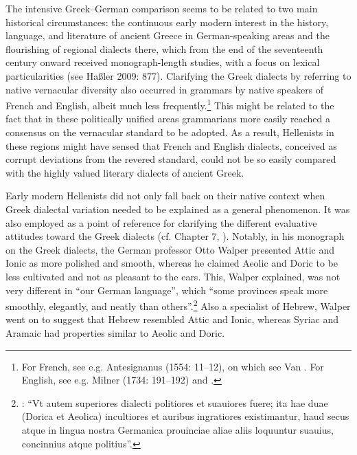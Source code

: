 \documentclass[output=paper]{langsci/langscibook}
\begin{document}
The intensive Greek–German comparison seems to be related to two main historical circumstances: the continuous early modern interest in the history, language, and literature of ancient Greece in German-speaking areas and the flourishing of regional dialects there, which from the end of the seventeenth century onward received monograph-length studies, with a focus on lexical particularities (see Haßler 2009: 877). Clarifying the Greek dialects by referring to native vernacular diversity also occurred in grammars by native speakers of French and English, albeit much less frequently.\footnote{For French, see e.g. Antesignanus (1554: 11–12), on which see Van \citet{Rooy2016c}. For English, see e.g. Milner (1734: 191–192) and \citet[121]{Holmes1735}.} This might be related to the fact that in these politically unified areas grammarians more easily reached a consensus on the vernacular standard to be adopted. As a result, Hellenists in these regions might have sensed that French and English dialects, conceived as corrupt deviations from the revered standard, could not be so easily compared with the highly valued literary dialects of ancient Greek.

Early modern Hellenists did not only fall back on their native context when Greek dialectal variation needed to be explained as a general phenomenon. It was also employed as a point of reference for clarifying the different evaluative attitudes toward the Greek dialects (cf. Chapter 7, ). Notably, in his monograph on the Greek dialects, the German professor Otto Walper presented Attic and Ionic as more polished and smooth, whereas he claimed Aeolic and Doric to be less cultivated and not as pleasant to the ears. This, Walper explained, was not very different in “our German language”, which “some provinces speak more smoothly, elegantly, and neatly than others”.\footnote{\citet[61]{Walper1589}: “Vt autem superiores dialecti politiores et suauiores fuere; ita hae duae (Dorica et Aeolica) incultiores et auribus ingratiores existimantur, haud secus atque in lingua nostra Germanica prouinciae aliae aliis loquuntur suauius, concinnius atque politius”.} Also a specialist of Hebrew, Walper went on to suggest that Hebrew resembled Attic and Ionic, whereas Syriac and Aramaic had properties similar to Aeolic and Doric.
\end{document}
